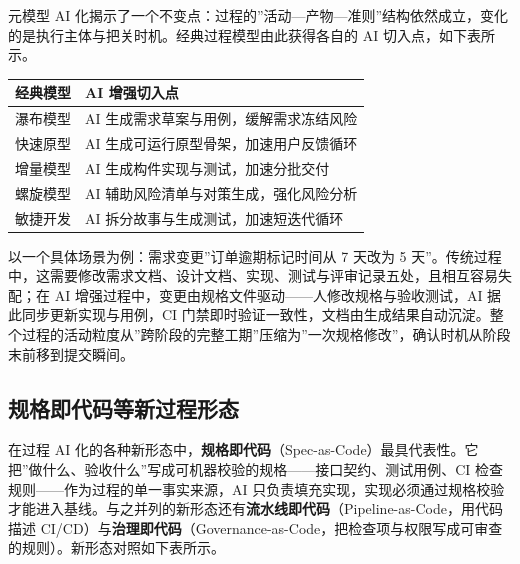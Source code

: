 \documentclass[
]{ctexbook}
\newcounter{none}
\begin{document}
元模型 AI
化揭示了一个不变点：过程的''活动---产物---准则''结构依然成立，变化的是执行主体与把关时机。经典过程模型由此获得各自的
AI 切入点，如下表所示。

{\def\LTcaptype{none} %
\begin{longtable}[]{@{}ll@{}}
\toprule\noalign{}
经典模型 & AI 增强切入点 \\
\midrule\noalign{}
\endhead
\bottomrule\noalign{}
\endlastfoot
瀑布模型 & AI 生成需求草案与用例，缓解需求冻结风险 \\
快速原型 & AI 生成可运行原型骨架，加速用户反馈循环 \\
增量模型 & AI 生成构件实现与测试，加速分批交付 \\
螺旋模型 & AI 辅助风险清单与对策生成，强化风险分析 \\
敏捷开发 & AI 拆分故事与生成测试，加速短迭代循环 \\
\end{longtable}
}

以一个具体场景为例：需求变更''订单逾期标记时间从 7 天改为 5
天''。传统过程中，这需要修改需求文档、设计文档、实现、测试与评审记录五处，且相互容易失配；在
AI 增强过程中，变更由规格文件驱动------人修改规格与验收测试，AI
据此同步更新实现与用例，CI
门禁即时验证一致性，文档由生成结果自动沉淀。整个过程的活动粒度从''跨阶段的完整工期''压缩为''一次规格修改''，确认时机从阶段末前移到提交瞬间。

\subsection{规格即代码等新过程形态}\label{ux89c4ux683cux5373ux4ee3ux7801ux7b49ux65b0ux8fc7ux7a0bux5f62ux6001}

在过程 AI
化的各种新形态中，\textbf{规格即代码}（Spec-as-Code）最具代表性。它把''做什么、验收什么''写成可机器校验的规格------接口契约、测试用例、CI
检查规则------作为过程的单一事实来源，AI
只负责填充实现，实现必须通过规格校验才能进入基线。与之并列的新形态还有\textbf{流水线即代码}（Pipeline-as-Code，用代码描述
CI/CD）与\textbf{治理即代码}（Governance-as-Code，把检查项与权限写成可审查的规则）。新形态对照如下表所示。
\end{document}
